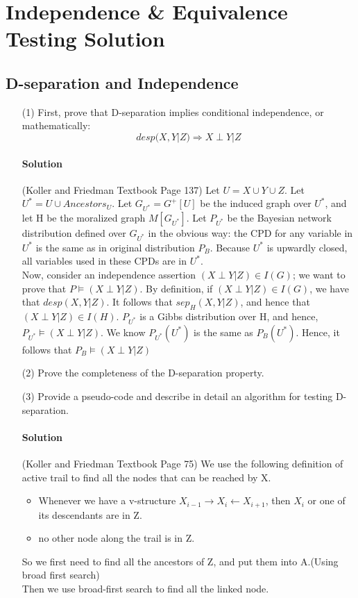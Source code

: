 \documentclass[twoside]{article}
\begin{document}
\newpage
\section{Independence \& Equivalence Testing Solution}
\subsection{D-separation and Independence}
\begin{itemize}
\item[(1)] First, prove that D-separation implies conditional independence, or mathematically:
$$desp(X,Y|Z) \Rightarrow X\perp Y |Z$$
\paragraph{Solution}(Koller and Friedman Textbook Page 137) 
Let ${U}={X}\cup {Y}\cup {Z}$.
Let ${U}^* = {U}\cup Ancestors_U$.
Let $G_{U^*}=G^+[ {U}]$ be the induced graph over $ {U}^*$, 
and let H be the moralized graph $M[G_{U^*}]$. 
Let $P_{U^*}$ be the Bayesian network distribution defined over $G_{U^*}$ in the obvious way:
the CPD for any variable in $U^*$ is the same as in original distribution $P_B$. Because $U^*$ is upwardly closed, 
all variables used in these CPDs are in $U^*$.\\
Now, consider an independence assertion $(X\perp Y |Z)\in I(G)$; we want to prove that $P\models (X\perp Y |Z)$. By definition, if  $(X\perp Y |Z)\in I(G)$, we have that $desp(X,Y|Z)$. It follows that $sep_H(X,Y|Z)$, and hence that $(X\perp Y|Z)\in I(H)$. $P_{U^*}$ is a Gibbs distribution over H, and hence, $P_{U^*} \models (X\perp Y|Z)$. We know $P_{U^*}(U^*)$ is the same as $P_B(U^*)$. Hence, it follows that $P_B\models (X\perp Y |Z)$


\item[(2)] Prove the completeness of the D-separation property.
\item[(3)] Provide a pseudo-code and describe in detail an algorithm for testing D-separation.
\paragraph{Solution}(Koller and Friedman Textbook Page 75) We use the following definition of active trail to find all the nodes that can be reached by X.
\begin{itemize}
\item Whenever we have a v-structure $X_{i-1}\rightarrow X_i \leftarrow X_{i+1}$, then $X_i$ or one of its descendants are in Z. 
\item no other node along the trail is in Z.
\end{itemize}
So we first need to find all the ancestors of Z, and put them into A.(Using broad first search)\\
Then we use broad-first search to find all the linked node.
\end{itemize}
\end{document}
